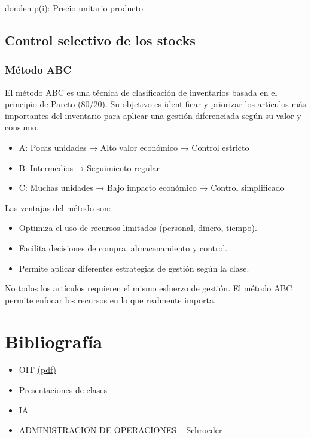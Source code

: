 \documentclass[a4paper,oneside,11pt]{article}
\begin{document}
donden p(i): Precio unitario producto





\subsection{Control selectivo de los stocks}


\subsubsection{Método ABC}

El método ABC es una técnica de clasificación de inventarios basada en el principio de Pareto (80/20). Su objetivo es identificar y priorizar los artículos más importantes del inventario para aplicar una gestión diferenciada según su valor y consumo. 

\begin{itemize}
    \item A: Pocas unidades → Alto valor económico → Control estricto
    \item B: Intermedios → Seguimiento regular
    \item C: Muchas unidades → Bajo impacto económico → Control simplificado
\end{itemize}

Las ventajas del método son: 

\begin{itemize}
    \item Optimiza el uso de recursos limitados (personal, dinero, tiempo).
    \item Facilita decisiones de compra, almacenamiento y control.
    \item Permite aplicar diferentes estrategias de gestión según la clase.
\end{itemize}

No todos los artículos requieren el mismo esfuerzo de gestión. El método ABC permite enfocar los recursos en lo que realmente importa.
























\clearpage
\section{Bibliografía}
\begin{itemize}
    \item OIT \href{https://teacherke.wordpress.com/wp-content/uploads/2010/09/introduccion-al-estudio-del-trabajo-oit.pdf}{(pdf) }
    \item Presentaciones de clases
    \item IA
    \item ADMINISTRACION DE OPERACIONES – Schroeder 
\end{itemize}
\end{document}
